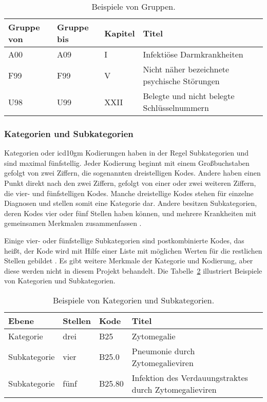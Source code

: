 
\begin{table}[ht]
	\centering
	\small
	\caption{Beispiele von Gruppen.}
	\label{tab:group}
	\begin{tabular}{|l|l|l|p{8cm}|}
		\hline
		\rowcolor{lightgray} Gruppe von & Gruppe bis & Kapitel & Titel \\
		\hline 
		\textsf{A00} &  \textsf{A09} & I & Infektiöse Darmkrankheiten \\ \hline
		\textsf{F99} &  \textsf{F99} & V & Nicht näher bezeichnete psychische Störungen \\ \hline
		\textsf{U98} &  \textsf{U99} & XXII & Belegte und nicht belegte Schlüsselnummern \\ \hline
	\end{tabular}
\end{table}

\subsubsection{Kategorien und Subkategorien} \label{subsubsec:categorysubcat}

Kategorien oder \ac{icd10gm} Kodierungen haben in der Regel Subkategorien und sind maximal fünfstellig. Jeder Kodierung beginnt mit einem Großbuchstaben gefolgt von zwei Ziffern, die sogenannten dreistelligen Kodes. Andere haben einen Punkt direkt nach den zwei Ziffern, gefolgt von einer oder zwei weiteren Ziffern, die vier- und fünfstelligen Kodes. Manche dreistellige Kodes stehen für einzelne Diagnosen und stellen somit eine Kategorie dar. Andere besitzen Subkategorien, deren Kodes vier oder fünf Stellen haben können, und  mehrere Krankheiten mit gemeinsamen Merkmalen zusammenfassen \cite{icd10systauf, icd10kateg}. 

Einige vier- oder fünfstellige Subkategorien sind postkombinierte Kodes, das heißt, der Kode wird mit Hilfe einer Liste mit möglichen Werten für die restlichen Stellen gebildet \cite{icd10kateg}. Es gibt weitere Merkmale der Kategorie und Kodierung, aber diese werden nicht in diesem Projekt behandelt. Die Tabelle~\ref{tab:catsubcat} illustriert Beispiele von Kategorien und Subkategorien.


\begin{table}[ht]
	\centering
	\small
	\caption{Beispiele von Kategorien und Subkategorien.}
	\label{tab:catsubcat}
	\begin{tabular}{|l|l|l|p{8cm}|}
		\hline
		\rowcolor{lightgray} Ebene & Stellen & Kode & Titel \\
		\hline 
		Kategorie &  drei & \textsf{B25} & Zytomegalie \\ \hline
		Subkategorie &  vier & \textsf{B25.0} & Pneumonie durch Zytomegalieviren \\ \hline
		Subkategorie &  fünf & \textsf{B25.80} & Infektion des Verdauungstraktes durch Zytomegalieviren \\ \hline
	\end{tabular}
\end{table}

